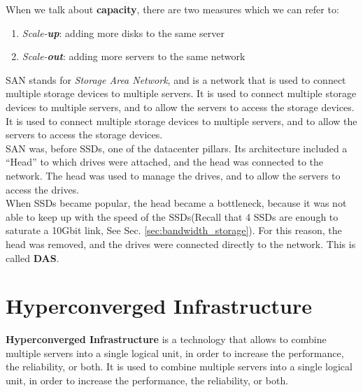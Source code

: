 
When we talk about \textbf{capacity}, there are two measures which we can refer to:
\begin{enumerate}
   \item \textit{Scale-\textbf{up}}:
   adding more disks to the same server
   \item \textit{Scale-\textbf{out}}:
   adding more servers to the same network
\end{enumerate}

SAN stands for \textit{Storage Area Network}, and is a network that is used to connect multiple storage devices to multiple servers. It is used to connect multiple storage devices to multiple servers, and to allow the servers to access the storage devices. It is used to connect multiple storage devices to multiple servers, and to allow the servers to access the storage devices.\\
SAN was, before SSDs, one of the datacenter pillars.
Its architecture included a ``Head'' to which drives were attached, and the head was connected to the network. The head was used to manage the drives, and to allow the servers to access the drives.\\
When SSDs became popular, the head became a bottleneck, because it was not able to keep up with the speed of the SSDs(Recall that 4 SSDs are enough to saturate a 10Gbit link, See Sec. \ref{sec:bandwidth_storage}). For this reason, the head was removed, and the drives were connected directly to the network. This is called \textbf{DAS}. 


\section{Hyperconverged Infrastructure}
\textbf{Hyperconverged Infrastructure} is a technology that allows to combine multiple servers into a single logical unit, in order to increase the performance, the reliability, or both. It is used to combine multiple servers into a single logical unit, in order to increase the performance, the reliability, or both.

